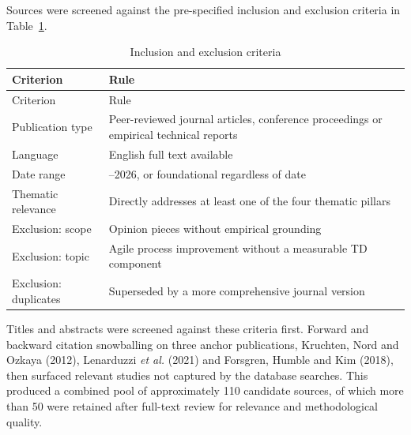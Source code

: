 \documentclass[
  12pt,
  letterpaper,
  12pt,
  oneside,
  english,
  onehalfspacing,
  headsepline]{MastersDoctoralThesis}
\begin{document}
Sources were screened against the pre-specified inclusion and exclusion
criteria in Table~\ref{tbl-criteria}.

\begin{samepage}
\scriptsize

\begin{longtable}[]{@{}
  >{\raggedright\arraybackslash}p{}
  >{\raggedright\arraybackslash}p{}@{}}
\caption{Inclusion and exclusion
criteria}\label{tbl-criteria}\tabularnewline
\toprule\noalign{}
\begin{minipage}[b]{\linewidth}\raggedright
Criterion
\end{minipage} & \begin{minipage}[b]{\linewidth}\raggedright
Rule
\end{minipage} \\
\midrule\noalign{}
\endfirsthead
\toprule\noalign{}
\begin{minipage}[b]{\linewidth}\raggedright
Criterion
\end{minipage} & \begin{minipage}[b]{\linewidth}\raggedright
Rule
\end{minipage} \\
\midrule\noalign{}
\endhead
\bottomrule\noalign{}
\endlastfoot
Publication type & Peer-reviewed journal articles, conference
proceedings or empirical technical reports \\
Language & English full text available \\
Date range & 2019--2026, or foundational regardless of date \\
Thematic relevance & Directly addresses at least one of the four
thematic pillars \\
Exclusion: scope & Opinion pieces without empirical grounding \\
Exclusion: topic & Agile process improvement without a measurable TD
component \\
Exclusion: duplicates & Superseded by a more comprehensive journal
version \\
\end{longtable}

\end{samepage}

Titles and abstracts were screened against these criteria first. Forward
and backward citation snowballing on three anchor publications,
Kruchten, Nord and Ozkaya (2012), Lenarduzzi \emph{et al.} (2021) and
Forsgren, Humble and Kim (2018), then surfaced relevant studies not
captured by the database searches. This produced a combined pool of
approximately 110 candidate sources, of which more than 50 were retained
after full-text review for relevance and methodological quality.
\end{document}
